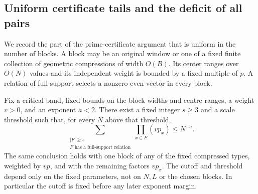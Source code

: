 \subsection{Uniform certificate tails and the deficit of all pairs}

We record the part of the prime-certificate argument that is uniform in
the number of blocks. A block may be an original window or one of a
fixed finite collection of geometric compressions of width $O(B)$.
Its center ranges over $O(N)$ values and its independent weight is
bounded by a fixed multiple of $p$. A relation of full support selects
a nonzero even vector in every block.

\begin{lemma}
\label{p13:transfer:independent-tail}
Fix a critical band, fixed bounds on the block widths and centre ranges,
a weight $v>0$, and an exponent $a<2$.
There exist a fixed integer $s\ge3$ and a scale threshold such that,
for every $N$ above that threshold,
\begin{equation}
 \sum_{\substack{|F|\ge s\\F\text{ has a full-support relation}}}
                  \prod_{x\in F}(vp_x)\le N^{-a}.
 \label{p13:transfer:tail-independent}
\end{equation}
The same conclusion holds with one block of any of the fixed compressed
types, weighted by $vp$, and with the remaining factors $vp_x$.
The cutoff and threshold depend only on the fixed parameters, not on
$N,L$ or the chosen blocks. In particular the cutoff is fixed before
any later exponent margin.
\end{lemma}


